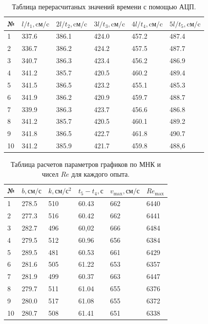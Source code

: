 \documentclass[12pt]{article}
\begin{document}
\begin{table}[h!]
\centering
\begin{tabular}{ |p{0.6cm}|p{1.9cm}|p{1.9cm}|p{1.9cm}|p{1.9cm}|p{1.9cm}| }
\hline
№ & $l/t_1, \text{cм}/\text{c}$ & $2l/t_2, \text{cм}/\text{c}$& $3l/t_3, \text{cм}/\text{c}$ & $4l/t_4, \text{cм}/\text{c}$ & $5l/t_5, \text{cм}/\text{c}$ \\
\hline
1&	337.6& 386.1& 424.0& 457.2&	487.4\\
\hline
2&	336.7& 386.2& 424.2& 457.5&	487.7\\
\hline
3&	340.7& 386.3& 423.4& 456.2&	486.9\\
\hline
4&	341.2& 385.7& 420.5& 460.2& 489.4\\
\hline
5&	341.5& 386.5& 423.2& 455.1& 485.3\\
\hline
6&	341.9& 386.2& 420.9& 459.7& 488.7\\
\hline
7&	339.9& 386.3& 423.7& 456.6& 486.8\\
\hline
8&	341.2& 385.7& 420.5& 460.1& 489.2\\
\hline
9&	341.8& 386.5& 422.7& 461.8& 490.7\\
\hline
10&	341.2& 385.9& 421.7& 459.8& 488,6\\
\hline
\end{tabular}
\caption{Таблица перерасчитаных значений времени с помощью АЦП.}
\end{table}
\begin{table}[h!]
\centering
\begin{tabular}{ |p{0.6cm}|p{1.9cm}|p{1.9cm}|p{1.9cm}|p{1.9cm}|p{1.9cm}| }
\hline
№ & $b, \text{см}/\text{с}$ & $k, \text{см}/\text{с}^2$ &$t_5-t_4 , \text{с}$& $v _{\max} , \text{см}/\text{с}$& $Re_{\max}$\\
\hline
1&	278.5& 510& 60.43& 662& 6440\\
\hline
2&	277.3& 516& 60.42& 662& 6441\\
\hline
3&	282.7& 496& 60,02& 666& 6484\\
\hline
4&	279.5& 512& 60.96& 656& 6384\\
\hline
5&	289.5& 481& 60.53& 661& 6429\\
\hline
6&	281.6& 505& 61.22& 653& 6357\\
\hline
7&	281.9& 499& 60.37& 663& 6447\\
\hline
8&	279.7& 511& 61.04& 655& 6376\\
\hline
9&	280.0& 517& 61.08& 655& 6372\\
\hline
10&	280.7& 508& 61.41& 651& 6338\\
\hline
\end{tabular}
\caption{Таблица расчетов параметров графиков по МНК и чисел $Re$ для каждого опыта.}
\end{table}
\end{document}
